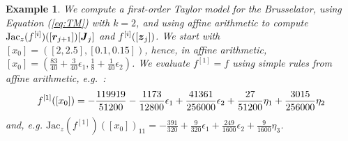\documentclass{sig-alternate-05-2015}
\newcommand\ForAuthors[1]%
 {\par\smallskip                     %
  \begin{center}%
   \fbox%
   {\parbox{0.9\linewidth}%
    {\raggedright\sc--- #1}%
   }%
  \end{center}%
  \par\smallskip                     %
 }
\newtheorem{example}{Example}
\def\intvl#1{\mbox{$[ #1 ]$}}
\begin{document}
\begin{example}
\label{running3}
We compute a first-order Taylor model for the Brusselator, using Equation
(\ref{eq:TM}) with $k=2$, and using affine arithmetic to compute 
$\mbox{Jac}_z(f^{[i]})([\r_{j+1}])[\J_j]$ and $f^{[i]}([{\z}_j])$.
We start with 
$\intvl{x_0}=\left([2,2.5],[0.1,0.15]\right)$, hence, in affine arithmetic,
$\intvl{x_0}=\left(\frac{83}{40}+\frac{3}{40}\epsilon_1,
\frac{1}{8}+\frac{1}{40}\epsilon_2\right)$. We evaluate $f^{[1]}=f$ using
simple rules from affine arithmetic, e.g.~: 
\begin{equation}
f^{[1]}(\intvl{x_0}) 
= 
\small 
-\frac{119919}{51200}-\frac{1173}{12800} \epsilon_1+\frac{41361}{256000}\epsilon_2
\label{firstcompf1}
+\frac{27}{51200}\eta_1+\frac{3015}{256000}\eta_2
\end{equation}
\noindent and, e.g. $
\mbox{Jac}_z(f^{[1]})([x_0])_{11} %
= 
-\frac{391}{320}+\frac{9}{320}\epsilon_1+\frac{249}{1600}\epsilon_2+\frac{9}{1600}\eta_3
$. 

\end{example}
\end{document}
